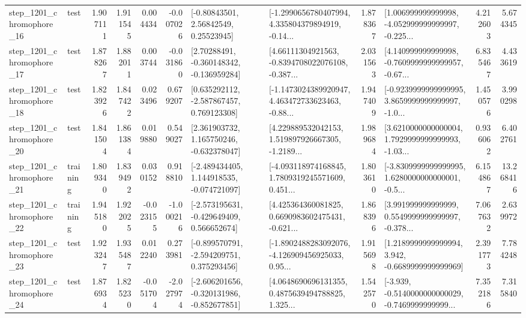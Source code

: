 \begin{tabular}{llrrrrllrlrr}
 step\_1201\_chromophore\_16 &      test &      1.907111 &    1.911545 &      0.004434 & -0.007026 &       [-0.80843501, 2.56842549, 0.25523945] &  [-1.2990656780407994, 4.335804379894919, -0.14... &       1.878367 &  [1.006999999999998, -4.052999999999997, -0.225... &            4.212603 &          5.674345 \\
 step\_1201\_chromophore\_17 &      test &      1.878267 &    1.882011 &      0.003744 & -0.031860 &    [2.70288491, -0.360148342, -0.136959284] &  [4.66111304921563, -0.8394708022076108, -0.387... &       2.031563 &  [4.140999999999998, -0.7609999999999957, -0.67... &            6.835467 &          4.433619 \\
 step\_1201\_chromophore\_18 &      test &      1.823926 &    1.847422 &      0.023496 &  0.679207 &    [0.635292112, -2.587867457, 0.769123308] &  [-1.1473024389920947, 4.463472733623463, -0.88... &       1.947409 &  [-0.9239999999999995, 3.8659999999999997, -1.0... &            1.450576 &          3.990298 \\
 step\_1201\_chromophore\_20 &      test &      1.841504 &    1.861384 &      0.019880 &  0.549027 &    [2.361903732, 1.165750246, -0.632378047] &  [4.229889532042153, 1.519897926667305, -1.2189... &       1.989684 &  [3.6210000000000004, 1.7929999999999993, -1.03... &            0.936062 &          6.402761 \\
 step\_1201\_chromophore\_21 &  training &      1.809340 &    1.839492 &      0.030152 &  0.918810 &   [-2.489434405, 1.144918535, -0.074721097] &  [-4.093118974168845, 1.7809319245571609, 0.451... &       1.803610 &  [-3.8309999999999995, 1.6280000000000001, -0.5... &            6.154867 &         13.268416 \\
 step\_1201\_chromophore\_22 &  training &      1.945180 &    1.922025 &     -0.023155 & -1.000216 &   [-2.573195631, -0.429649409, 0.566652674] &  [4.425364360081825, 0.6690983602475431, -0.621... &       1.868396 &  [3.991999999999999, 0.5549999999999997, -0.378... &            7.067632 &          2.639972 \\
 step\_1201\_chromophore\_23 &      test &      1.923247 &    1.935487 &      0.012240 &  0.273981 &   [-0.899570791, -2.594209751, 0.375293456] &  [-1.8902488283092076, -4.126909456925033, 0.95... &       1.915698 &   [1.2189999999999994, 3.942, -0.6689999999999969] &            2.391773 &          7.784248 \\
 step\_1201\_chromophore\_24 &      test &      1.876934 &    1.825230 &     -0.051704 & -2.027974 &  [-2.606201656, -0.320131986, -0.852677851] &  [4.0648690696131355, 0.4875639494788825, 1.325... &       1.542570 &  [-3.939, -0.5140000000000029, -0.7469999999999... &            7.352186 &          7.315840 \\

\end{tabular}
